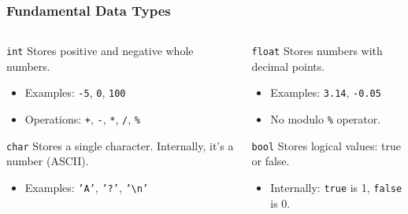 \documentclass{beamer}
\begin{document}
\begin{frame}
\frametitle{Fundamental Data Types}
\begin{columns}[T]
\begin{column}{0.5\textwidth}
    \begin{alertblock}{\texttt{int}}
        Stores positive and negative \alert{whole numbers}.\pause
        \begin{itemize}
            \item Examples: \texttt{-5}, \texttt{0}, \texttt{100}\pause
            \item Operations: \texttt{+}, \texttt{-}, \texttt{*}, \texttt{/}, \texttt{\%}
        \end{itemize}
    \end{alertblock}
    \pause
    \begin{exampleblock}{\texttt{char}}
        Stores a \alert{single character}. Internally, it's a number (ASCII).\pause
        \begin{itemize}
            \item Examples: \texttt{'A'}, \texttt{'?'}, \texttt{'\textbackslash n'}
        \end{itemize}
    \end{exampleblock}
\end{column}\pause
\begin{column}{0.5\textwidth}
    \begin{block}{\texttt{float}}
        Stores numbers with \alert{decimal points}.\pause
        \begin{itemize}
            \item Examples: \texttt{3.14}, \texttt{-0.05}\pause
            \item No modulo \texttt{\%} operator.
        \end{itemize}
    \end{block}
    \pause
    \begin{alertblock}{\texttt{bool}}
        Stores logical values: \alert{true} or \alert{false}.\pause
        \begin{itemize}
            \item Internally: \texttt{true} is 1, \texttt{false} is 0.
        \end{itemize}
    \end{alertblock}
\end{column}
\end{columns}
\end{frame}
\end{document}
